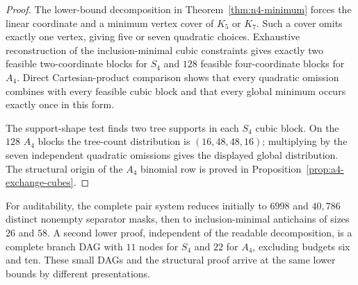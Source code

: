 \begin{proof}
The lower-bound decomposition in Theorem~\ref{thm:n4-minimum} forces the
linear coordinate and a minimum vertex cover of $K_5$ or $K_7$.  Such a cover
omits exactly one vertex, giving five or seven quadratic choices.  Exhaustive
reconstruction of the inclusion-minimal cubic constraints gives exactly two
feasible two-coordinate blocks for $S_4$ and $128$ feasible four-coordinate
blocks for $A_4$.  Direct Cartesian-product comparison shows that every
quadratic omission combines with every feasible cubic block and that every
global minimum occurs exactly once in this form.

The support-shape test finds two tree supports in each $S_4$ cubic block.  On
the $128$ $A_4$ blocks the tree-count distribution is
$(16,48,48,16)$; multiplying by the seven independent quadratic omissions
gives the displayed global distribution.  The structural origin of the
$A_4$ binomial row is proved in Proposition~\ref{prop:a4-exchange-cubes}.
\end{proof}



For auditability, the complete pair system reduces initially to $6998$ and
$40{,}786$ distinct nonempty separator masks, then to inclusion-minimal
antichains of sizes $26$ and $58$.  A second lower proof, independent of the
readable decomposition, is a complete branch DAG with $11$ nodes for $S_4$
and $22$ for $A_4$, excluding budgets six and ten.  These small DAGs and the
structural proof arrive at the same lower bounds by different presentations.
